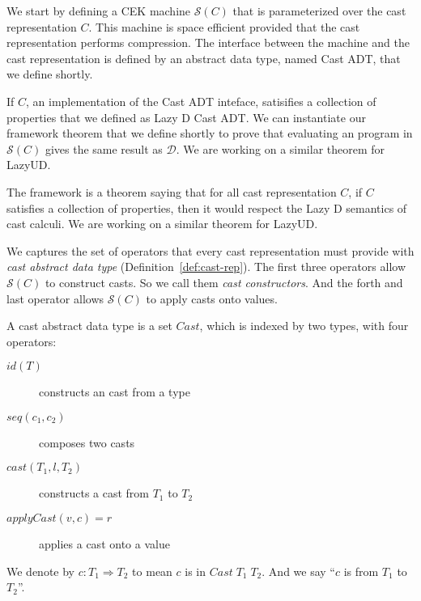 \documentclass[acmsmall,review,anonymous]{acmart}\settopmatter{printfolios=true,printccs=false,printacmref=false}
\newcommand{\judgeTypeFT}[3]{#1 : #2 \Longrightarrow #3} %
\newcommand{\lazyUD}{Lazy\;UD}
\newcommand{\lazyD}{Lazy\;D}
\newcommand{\ineffCEKD}{$\mathcal{D}$}
\newcommand{\effCEK}[1]{$\mathcal{S}(#1)$}
\begin{document}
We start by defining a CEK machine \effCEK{C} that is parameterized
over the cast representation $C$. This machine is space efficient
provided that the cast representation performs compression.  The
interface between the machine and the cast representation is defined
by an abstract data type, named Cast ADT, that we define shortly.
%


If $C$, an implementation of the Cast ADT inteface, satisifies a collection of 
properties that we defined as Lazy D Cast ADT. We can instantiate our framework 
theorem that we define shortly to prove that evaluating an program in 
\effCEK{C} gives the same result as \ineffCEKD. We are working on a
similar theorem for \lazyUD{}. 




The framework is a theorem saying that for all cast representation $C
$, if $C$ satisfies a collection of properties, then it would
respect the Lazy D semantics of cast calculi. We are working on a
similar theorem for \lazyUD{}.


We captures the set of operators that every cast representation must provide 
with \emph{cast abstract data type} (Definition~\ref{def:cast-rep}). 
The first three operators allow \effCEK{C} to construct casts. 
So we call them \textit{cast constructors}. And the forth and last operator 
allows \effCEK{C} to apply casts onto values. 

\begin{definition}
	\label{def:cast-rep}
	A cast abstract data type is a set $Cast$, which is indexed by two types, 
	with four operators:
	\begin{description}
		\item[$id(T)$] constructs an cast from a type
		\item[$seq(c_1,c_2)$] composes two casts
		\item[$cast(T_1,l,T_2)$] constructs a cast from $T_1$ to $T_2$
		\item[$ applyCast(v,c)=r$] applies a cast onto a value
	\end{description}
	We denote by $c : T_1 \Longrightarrow T_2$ to mean $c$ is in $Cast \; 
	T_1 \; T_2$. And we say ``$c$ is from $T_1$ to $T_2$''.
\end{definition}
\end{document}
